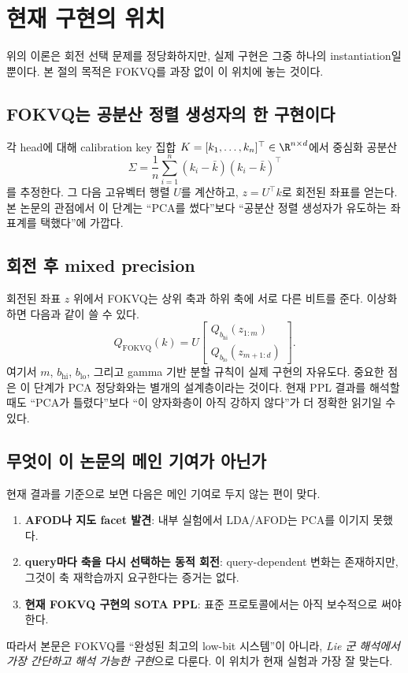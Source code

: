 \section{현재 구현의 위치}

위의 이론은 회전 선택 문제를 정당화하지만, 실제 구현은 그중 하나의 instantiation일 뿐이다. 본 절의 목적은 FOKVQ를 과장 없이 이 위치에 놓는 것이다.

\subsection{FOKVQ는 공분산 정렬 생성자의 한 구현이다}

각 head에 대해 calibration key 집합 $K=[k_1,\dots,k_n]^\top \in \R^{n \times d}$에서 중심화 공분산
\[
\Sigma=\frac{1}{n}\sum_{i=1}^{n}(k_i-\bar{k})(k_i-\bar{k})^\top
\]
를 추정한다. 그 다음 고유벡터 행렬 $U$를 계산하고, $z=U^\top k$로 회전된 좌표를 얻는다. 본 논문의 관점에서 이 단계는 ``PCA를 썼다''보다 ``공분산 정렬 생성자가 유도하는 좌표계를 택했다''에 가깝다.

\subsection{회전 후 mixed precision}

회전된 좌표 $z$ 위에서 FOKVQ는 상위 축과 하위 축에 서로 다른 비트를 준다. 이상화하면 다음과 같이 쓸 수 있다.
\[
Q_{\mathrm{FOKVQ}}(k)=U
\begin{bmatrix}
Q_{b_{\mathrm{hi}}}(z_{1:m})\\
Q_{b_{\mathrm{lo}}}(z_{m+1:d})
\end{bmatrix}.
\]
여기서 $m$, $b_{\mathrm{hi}}$, $b_{\mathrm{lo}}$, 그리고 gamma 기반 분할 규칙이 실제 구현의 자유도다. 중요한 점은 이 단계가 PCA 정당화와는 별개의 설계층이라는 것이다. 현재 PPL 결과를 해석할 때도 ``PCA가 틀렸다''보다 ``이 양자화층이 아직 강하지 않다''가 더 정확한 읽기일 수 있다.

\subsection{무엇이 이 논문의 메인 기여가 아닌가}

현재 결과를 기준으로 보면 다음은 메인 기여로 두지 않는 편이 맞다.

\begin{enumerate}
\item \textbf{AFOD나 지도 facet 발견}: 내부 실험에서 LDA/AFOD는 PCA를 이기지 못했다.
\item \textbf{query마다 축을 다시 선택하는 동적 회전}: query-dependent 변화는 존재하지만, 그것이 축 재학습까지 요구한다는 증거는 없다.
\item \textbf{현재 FOKVQ 구현의 SOTA PPL}: 표준 프로토콜에서는 아직 보수적으로 써야 한다.
\end{enumerate}

따라서 본문은 FOKVQ를 ``완성된 최고의 low-bit 시스템''이 아니라, \emph{Lie 군 해석에서 가장 간단하고 해석 가능한 구현}으로 다룬다. 이 위치가 현재 실험과 가장 잘 맞는다.
